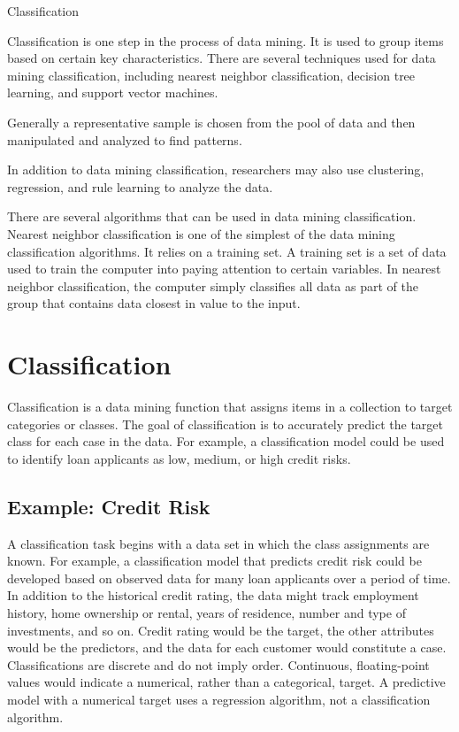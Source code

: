 Classification 	
\item Classification is one step in the process of data mining. It is used to group items based on certain key characteristics. There are several techniques used for data mining classification, including nearest neighbor classification, decision tree learning, and support vector machines.

\item Generally a representative sample is chosen from the pool of data and then manipulated and analyzed to find patterns. 

\item In addition to data mining classification, researchers may also use clustering, regression, and rule learning to analyze the data.

\item There are several algorithms that can be used in data mining classification. Nearest neighbor classification is one of the simplest of the data mining classification algorithms. It relies on a training set. A training set is a set of data used to train the computer into paying attention to certain variables. In nearest neighbor classification, the computer simply classifies all data as part of the group that contains data closest in value to the input.

\section{Classification}
Classification is a data mining function that assigns items in a collection to target categories or classes. The goal of classification is to accurately predict the target class for each case in the data. For example, a classification model could be used to identify loan applicants as low, medium, or high credit risks.

\subsection{Example: Credit Risk}
A classification task begins with a data set in which the class assignments are known. For example, a classification model that predicts credit risk could be developed based on observed data for many loan applicants over a period of time. In addition to the historical credit rating, the data might track employment history, home ownership or rental, years of residence, number and type of investments, and so on. Credit rating would be the target, the other attributes would be the predictors, and the data for each customer would constitute a case.
Classifications are discrete and do not imply order. Continuous, floating-point values would indicate a numerical, rather than a categorical, target. A predictive model with a numerical target uses a regression algorithm, not a classification algorithm.

